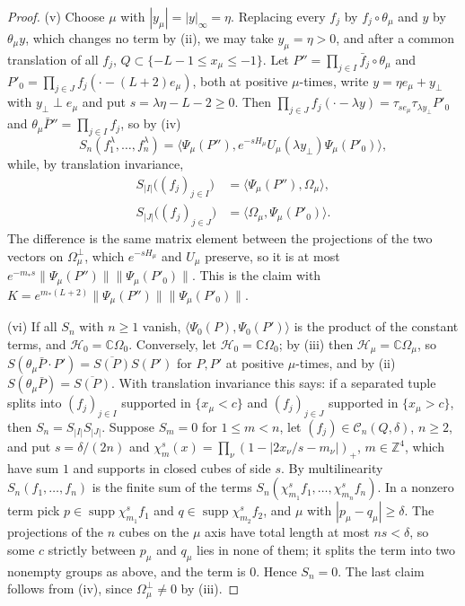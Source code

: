 \documentclass[aps,prd,twocolumn,superscriptaddress,nofootinbib,longbibliography,floatfix,amsmath,amssymb,10pt]{revtex4-2}
\theoremstyle{definition}
\theoremstyle{remark}
\newcommand{\Z}{\mathbb{Z}}
\newcommand{\C}{\mathbb{C}}
\newcommand{\ip}[2]{\langle #1,#2\rangle}
\begin{document}
\begin{proof}
(v) Choose $\mu$ with $|y_\mu|=|y|_\infty=\eta$. Replacing every $f_j$ by
$f_j\circ\theta_\mu$ and $y$ by $\theta_\mu y$, which changes no term by
(ii), we may take $y_\mu=\eta>0$, and after a common translation of all
$f_j$, $Q\subset\{-L-1\le x_\mu\le-1\}$. Let $P''=\prod_{j\in I}\bar f_j
\circ\theta_\mu$ and $P'_0=\prod_{j\in J}f_j(\cdot-(L+2)e_\mu)$, both at
positive $\mu$-times, write $y=\eta e_\mu+y_\perp$ with $y_\perp\perp e_\mu$
and put $s=\lambda\eta-L-2\ge0$. Then $\prod_{j\in J}f_j(\cdot-\lambda y)=
\tau_{se_\mu}\tau_{\lambda y_\perp}P'_0$ and $\theta_\mu\bar P''=\prod_{j\in
I}f_j$, so by (iv)
\[
S_n(f^\lambda_1,\dots,f^\lambda_n)=\ip{\Psi_\mu(P'')}{e^{-sH_\mu}U_\mu(
\lambda y_\perp)\Psi_\mu(P'_0)} ,
\]
while, by translation invariance,
\[
\begin{split}
S_{|I|}\bigl((f_j)_{j\in I}\bigr)&=\ip{\Psi_\mu(P'')}{\Omega_\mu},\\
S_{|J|}\bigl((f_j)_{j\in J}\bigr)&=\ip{\Omega_\mu}{\Psi_\mu(P'_0)} .
\end{split}
\]
The difference is the same matrix element between the
projections of the two vectors on $\Omega_\mu^\perp$, which $e^{-sH_\mu}$
and $U_\mu$ preserve, so it is at most $e^{-m_*s}\|\Psi_\mu(P'')\|
\|\Psi_\mu(P'_0)\|$. This is the claim with $K=e^{m_*(L+2)}\|\Psi_\mu(
P'')\|\|\Psi_\mu(P'_0)\|$.

(vi) If all $S_n$ with $n\ge1$ vanish, $\ip{\Psi_0(P)}{\Psi_0(P')}$ is the
product of the constant terms, and $\mathcal H_0=\C\Omega_0$. Conversely,
let $\mathcal H_0=\C\Omega_0$; by (iii) then $\mathcal H_\mu=\C\Omega_\mu$,
so $S(\theta_\mu\bar P\cdot P')=\overline{S(P)}S(P')$ for $P,P'$ at
positive $\mu$-times, and by (ii) $S(\theta_\mu\bar P)=\overline{S(P)}$.
With translation invariance this says: if a separated tuple splits into
$(f_j)_{j\in I}$ supported in $\{x_\mu<c\}$ and $(f_j)_{j\in J}$ supported
in $\{x_\mu>c\}$, then $S_n=S_{|I|}S_{|J|}$. Suppose $S_m=0$ for $1\le m<n$,
let $(f_j)\in\mathcal C_n(Q,\delta)$, $n\ge2$, and put $s=\delta/(2n)$ and
$\chi^s_m(x)=\prod_\nu(1-|2x_\nu/s-m_\nu|)_+$, $m\in\Z^4$, which have sum
$1$ and supports in closed cubes of side $s$. By multilinearity
$S_n(f_1,\dots,f_n)$ is the finite sum of the terms $S_n(\chi^s_{m_1}f_1,
\dots,\chi^s_{m_n}f_n)$. In a nonzero term pick $p\in\operatorname{supp}
\chi^s_{m_1}f_1$ and $q\in\operatorname{supp}\chi^s_{m_2}f_2$, and $\mu$
with $|p_\mu-q_\mu|\ge\delta$. The projections of the $n$ cubes on the
$\mu$ axis have total length at most $ns<\delta$, so some $c$ strictly
between $p_\mu$ and $q_\mu$ lies in none of them; it splits the term into
two nonempty groups as above, and the term is $0$. Hence $S_n=0$. The last
claim follows from (iv), since $\Omega_\mu^\perp\ne0$ by (iii).


\end{proof}
\end{document}
